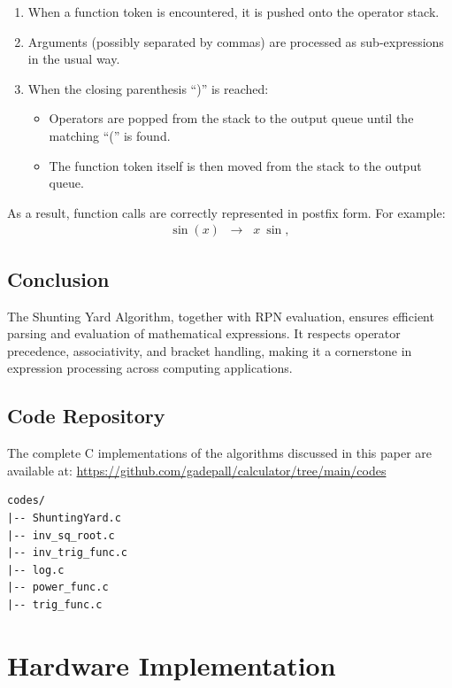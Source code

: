 \documentclass[conference]{IEEEtran}
\begin{document}
\begin{enumerate}
    \item When a function token is encountered, it is pushed onto the operator stack.
    \item Arguments (possibly separated by commas) are processed as sub-expressions in the usual way.
    \item When the closing parenthesis ``)'' is reached:
    \begin{itemize}
        \item Operators are popped from the stack to the output queue until the matching ``('' is found.
        \item The function token itself is then moved from the stack to the output queue.
    \end{itemize}
\end{enumerate}

As a result, function calls are correctly represented in postfix form. For example:
\begin{align}
\sin(x) \;\;\rightarrow\;\; x \ \sin, 
\end{align}


\subsection{Conclusion}
The Shunting Yard Algorithm, together with RPN evaluation, ensures efficient parsing and evaluation of mathematical expressions. It respects operator precedence, associativity, and bracket handling, making it a cornerstone in expression processing across computing applications.

\subsection{Code Repository}
The complete C implementations of the algorithms discussed in this paper are available at: \url{https://github.com/gadepall/calculator/tree/main/codes}


\begin{lstlisting}[caption={Repository Structure in codes/}]
codes/
|-- ShuntingYard.c
|-- inv_sq_root.c
|-- inv_trig_func.c
|-- log.c
|-- power_func.c
|-- trig_func.c
\end{lstlisting}

\section{Hardware Implementation}
\end{document}
